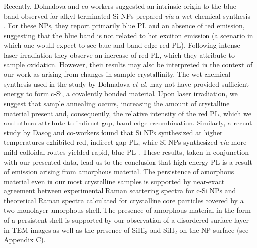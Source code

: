 Recently, Dohnalova and co-workers suggested an intrinsic origin to the blue band observed for alkyl-terminated Si NPs prepared \emph{via} a wet chemical synthesis \cite{dohnalova2013surface}. For these NPs, they report primarily blue PL and an absence of red emission, suggesting that the blue band is not related to hot exciton emission (a scenario in which one would expect to see blue and band-edge red PL). Following intense laser irradiation they observe an increase of red PL, which they attribute to sample oxidation. However, their results may also be interpreted in the context of our work as arising from changes in sample crystallinity. The wet chemical synthesis used in the study by Dohnalova \emph{et al.} may not have provided sufficient energy to form c-Si, a covalently bonded material. Upon laser irradiation, we suggest that sample annealing occurs, increasing the amount of crystalline material present and, consequently, the relative intensity of the red PL, which we and others attribute to indirect gap, band-edge recombination. Similarly, a recent study by Dasog and co-workers found that Si NPs synthesized at higher temperatures exhibited red, indirect gap PL, while Si NPs synthesized \emph{via} more mild colloidal routes yielded rapid, blue PL \cite{dasog2013chemical}. These results, taken in conjunction with our presented data, lead us to the conclusion that high-energy PL is a result of emission arising from amorphous material. The persistence of amorphous material even in our most crystalline samples is supported by near-exact agreement between experimental Raman scattering spectra for c-Si NPs and theoretical Raman spectra calculated for crystalline core particles covered by a two-monolayer amorphous shell. The presence of amorphous material in the form of a persistent shell is supported by our observation of a disordered surface layer in TEM images as well as the presence of SiHi$_3$ and SiH$_2$ on the NP surface (see Appendix C). \par

